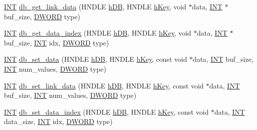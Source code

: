 \begin{DoxyCompactItemize}
\item 
\hyperlink{vppg_8h_a392e62da233ed3e2f7c3fd4f487a3896}{INT} \hyperlink{group__odbfunctionc_gaf07dd1abe9b9f63238c9b1d9a3bd5cc0}{db\_\-get\_\-link\_\-data} (HNDLE \hyperlink{mevb_8c_ab1f60c53f74e806a3b9f687af38d7421}{hDB}, HNDLE \hyperlink{mevb_8c_a8cd567d23219ba7fc83280cf20caf1c2}{hKey}, void $\ast$data, \hyperlink{vppg_8h_a392e62da233ed3e2f7c3fd4f487a3896}{INT} $\ast$buf\_\-size, \hyperlink{vt2_8h_a798af1e30bc65f319c1a246cecf59e39}{DWORD} type)
\item 
\hyperlink{vppg_8h_a392e62da233ed3e2f7c3fd4f487a3896}{INT} \hyperlink{group__odbfunctionc_gab98f9bb7f141c72261bf56407370fab3}{db\_\-get\_\-data\_\-index} (HNDLE \hyperlink{mevb_8c_ab1f60c53f74e806a3b9f687af38d7421}{hDB}, HNDLE \hyperlink{mevb_8c_a8cd567d23219ba7fc83280cf20caf1c2}{hKey}, void $\ast$data, \hyperlink{vppg_8h_a392e62da233ed3e2f7c3fd4f487a3896}{INT} $\ast$buf\_\-size, \hyperlink{vppg_8h_a392e62da233ed3e2f7c3fd4f487a3896}{INT} idx, \hyperlink{vt2_8h_a798af1e30bc65f319c1a246cecf59e39}{DWORD} type)
\item 
\hyperlink{vppg_8h_a392e62da233ed3e2f7c3fd4f487a3896}{INT} \hyperlink{group__odbfunctionc_gaa3f93c5321c56ad5a5200d17958e9bb3}{db\_\-set\_\-data} (HNDLE \hyperlink{mevb_8c_ab1f60c53f74e806a3b9f687af38d7421}{hDB}, HNDLE \hyperlink{mevb_8c_a8cd567d23219ba7fc83280cf20caf1c2}{hKey}, const void $\ast$data, \hyperlink{vppg_8h_a392e62da233ed3e2f7c3fd4f487a3896}{INT} buf\_\-size, \hyperlink{vppg_8h_a392e62da233ed3e2f7c3fd4f487a3896}{INT} num\_\-values, \hyperlink{vt2_8h_a798af1e30bc65f319c1a246cecf59e39}{DWORD} type)
\item 
\hyperlink{vppg_8h_a392e62da233ed3e2f7c3fd4f487a3896}{INT} \hyperlink{group__odbfunctionc_gac4242bdfa7376f491b501e009aa1f840}{db\_\-set\_\-link\_\-data} (HNDLE \hyperlink{mevb_8c_ab1f60c53f74e806a3b9f687af38d7421}{hDB}, HNDLE \hyperlink{mevb_8c_a8cd567d23219ba7fc83280cf20caf1c2}{hKey}, const void $\ast$data, \hyperlink{vppg_8h_a392e62da233ed3e2f7c3fd4f487a3896}{INT} buf\_\-size, \hyperlink{vppg_8h_a392e62da233ed3e2f7c3fd4f487a3896}{INT} num\_\-values, \hyperlink{vt2_8h_a798af1e30bc65f319c1a246cecf59e39}{DWORD} type)
\item 
\hyperlink{vppg_8h_a392e62da233ed3e2f7c3fd4f487a3896}{INT} \hyperlink{group__odbfunctionc_ga298462cf44f9ed6ea7c64ffdf23617d9}{db\_\-set\_\-data\_\-index} (HNDLE \hyperlink{mevb_8c_ab1f60c53f74e806a3b9f687af38d7421}{hDB}, HNDLE \hyperlink{mevb_8c_a8cd567d23219ba7fc83280cf20caf1c2}{hKey}, const void $\ast$data, \hyperlink{vppg_8h_a392e62da233ed3e2f7c3fd4f487a3896}{INT} data\_\-size, \hyperlink{vppg_8h_a392e62da233ed3e2f7c3fd4f487a3896}{INT} idx, \hyperlink{vt2_8h_a798af1e30bc65f319c1a246cecf59e39}{DWORD} type)

\end{DoxyCompactItemize}
